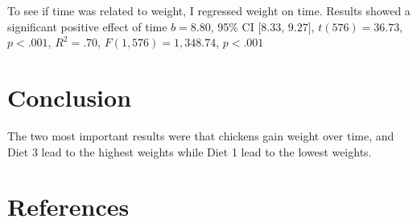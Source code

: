 \documentclass[english,man]{apa6}
\begin{document}
To see if time was related to weight, I regressed weight on time.
Results showed a significant positive effect of time \(b = 8.80\), 95\%
CI \([8.33\), \(9.27]\), \(t(576) = 36.73\), \(p < .001\),
\(R^2 = .70\), \(F(1, 576) = 1,348.74\), \(p < .001\)

\section{Conclusion}\label{conclusion}

The two most important results were that chickens gain weight over time,
and Diet 3 lead to the highest weights while Diet 1 lead to the lowest
weights.

\newpage

\section{References}\label{references}

\setlength{\parindent}{-0.5in} \setlength{\leftskip}{0.5in}
\end{document}
